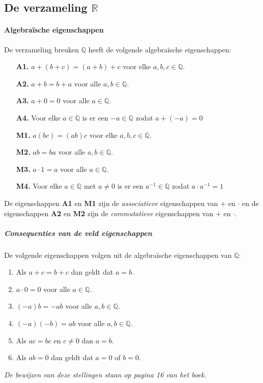 \subsection{De verzameling $\mathbb{R}$}
\paragraph{Algebraïsche eigenschappen}De verzameling breuken $\mathbb{Q}$ heeft de volgende algebraïsche eigenschappen:
\begin{itemize}
    \setlength\itemsep{0em}
    \item[\textbf{A1.}] $a+(b+c)=(a+b)+c$ voor elke $a,b,c\in\mathbb{Q}$.
    \item[\textbf{A2.}] $a+b=b+a$ voor alle $a,b\in\mathbb{Q}$.
    \item[\textbf{A3.}] $a+0=0$ voor alle $a\in\mathbb{Q}$.
    \item[\textbf{A4.}] Voor elke $a\in\mathbb{Q}$ is er een $-a\in\mathbb{Q}$ zodat $a+(-a)=0$
    \item[\textbf{M1.}] $a(bc)=(ab)c$ voor elke $a,b,c\in\mathbb{Q}$.
    \item[\textbf{M2.}] $ab=ba$ voor alle $a,b\in\mathbb{Q}$.
    \item[\textbf{M3.}] $a\cdot1=a$ voor alle $a\in\mathbb{Q}$.
    \item[\textbf{M4.}] Voor elke $a\in\mathbb{Q}$ met $a\neq0$ is er een $a^{-1}\in\mathbb{Q}$ zodat $a \cdot a^{-1} = 1$
\end{itemize}
De eigenschappen \textbf{A1} en \textbf{M1} zijn de \textit{associatieve} eigenschappen van $+$ en $\cdot$ en de eigenschappen \textbf{A2} en \textbf{M2} zijn de \textit{commutatieve} eigenschappen van $+$ en $\cdot$.

\subparagraph{Consequenties van de veld eigenschappen} De volgende eigenschappen volgen uit de algebraïsche eigenschappen van $\mathbb{Q}$:

\begin{enumerate}
    \setlength\itemsep{0em}
    \item Als $a+c=b+c$ dan geldt dat $a=b$.
    \item $a\cdot0=0$ voor alle $a\in\mathbb{Q}$.
    \item $(-a)b=-ab$ voor alle $a,b\in\mathbb{Q}$.
    \item $(-a)(-b)=ab$ voor alle $a,b\in\mathbb{Q}$.
    \item Als $ac=bc$ en $c\neq0$ dan $a=b$.
    \item Als $ab=0$ dan geldt dat $a=0$ of $b=0$.
\end{enumerate}
\textit{De bewijzen van deze stellingen staan op pagina 16 van het boek.}

